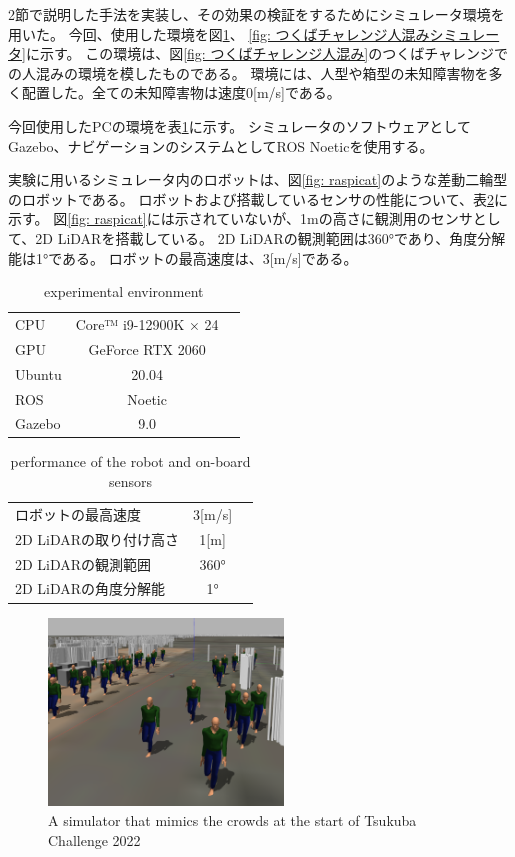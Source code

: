 \documentclass{jarticle}
\begin{document}
2節で説明した手法を実装し、その効果の検証をするためにシミュレータ環境を用いた。
今回、使用した環境を図\ref{fig: 人混みガゼボ}、
\ref{fig: つくばチャレンジ人混みシミュレータ}に示す。
この環境は、図\ref{fig: つくばチャレンジ人混み}のつくばチャレンジでの人混みの環境を模したものである。
環境には、人型や箱型の未知障害物を多く配置した。全ての未知障害物は速度0[m/s]である。

今回使用したPCの環境を表\ref{table: PCの環境}に示す。
シミュレータのソフトウェアとしてGazebo、ナビゲーションのシステムとしてROS Noeticを使用する。

実験に用いるシミュレータ内のロボットは、図\ref{fig: raspicat}のような差動二輪型のロボットである。
ロボットおよび搭載しているセンサの性能について、表\ref{table: ロボットおよび搭載しているセンサの性能}に示す。
図\ref{fig: raspicat}には示されていないが、1mの高さに観測用のセンサとして、2D LiDARを搭載している。
2D LiDARの観測範囲は360°であり、角度分解能は1°である。
ロボットの最高速度は、3[m/s]である。

\begin{table}[hbtp]
  \caption{experimental environment}
  \label{table: PCの環境}
  \centering
  \begin{tabular}{lcr}
    \hline
    CPU & Core™ i9-12900K × 24 \\
    GPU & GeForce RTX 2060 \\
    Ubuntu & 20.04 \\
    ROS  & Noetic \\
    Gazebo  &  9.0 \\
    \hline
  \end{tabular}
\end{table}

\begin{table}[hbtp]
  \caption{performance of the robot and on-board sensors}
  \label{table: ロボットおよび搭載しているセンサの性能}
  \centering
  \begin{tabular}{lcr}
    \hline
    ロボットの最高速度 & 3[m/s] \\
    2D LiDARの取り付け高さ & 1[m] \\
    2D LiDARの観測範囲 & 360° \\
    2D LiDARの角度分解能 & 1° \\
    \hline
  \end{tabular}
\end{table}

\begin{figure}[htbp]
  \centering
   \includegraphics[height=50mm]{fig/hitogomi_gazebo.png}
   \vspace*{-4mm}
   \caption{A simulator that mimics the crowds at the start of Tsukuba Challenge 2022}
   \label{fig: 人混みガゼボ}
\end{figure}
\end{document}
